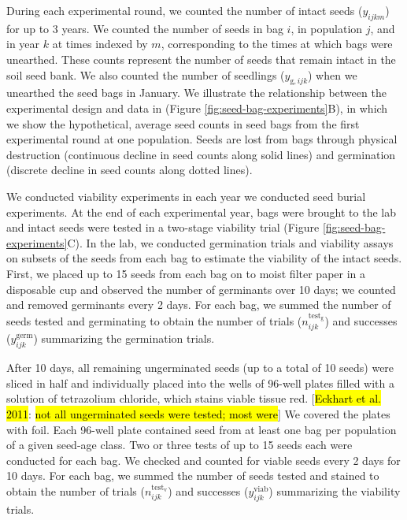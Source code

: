\documentclass[12pt, oneside, titlepage]{article}   	%
\begin{document}
During each experimental round, we counted the number of intact seeds ($y_{ijkm}$) for up to 3 years. We counted the number of seeds in bag $i$, in population $j$, and in year $k$ at times indexed by $m$, corresponding to the times at which bags were unearthed. These counts represent the number of seeds that remain intact in the soil seed bank. We also counted the number of seedlings ($y_{\mathrm{g},ijk}$) when we unearthed the seed bags in January. We illustrate the relationship between the experimental design and data in (Figure \ref{fig:seed-bag-experiments}B), in which we show the hypothetical, average seed counts in seed bags from the first experimental round at one population. Seeds are lost from bags through physical destruction (continuous decline in seed counts along solid lines) and germination (discrete decline in seed counts along dotted lines). 

We conducted viability experiments in each year we conducted seed burial experiments. At the end of each experimental year, bags were brought to the lab and intact seeds were tested in a two-stage viability trial (Figure \ref{fig:seed-bag-experiments}C). In the lab, we conducted germination trials and viability assays on subsets of the seeds from each bag to estimate the viability of the intact seeds. First, we placed up to 15 seeds from each bag on to moist filter paper in a disposable cup and observed the number of germinants over 10 days; we counted and removed germinants every 2 days. For each bag, we summed the number of seeds tested and germinating to obtain the number of trials ($n^\mathrm{test_g}_{ijk}$) and successes ($y^{\mathrm{germ}}_{ijk}$) summarizing the germination trials. 

After 10 days, all remaining ungerminated seeds (up to a total of 10 seeds) were sliced in half and individually placed into the wells of 96-well plates filled with a solution of tetrazolium chloride, which stains viable tissue red. [\hl{Eckhart et al. 2011}: \hl{not all ungerminated seeds were tested; most were}] We covered the plates with foil. Each 96-well plate contained seed from at least one bag per population of a given seed-age class. Two or three tests of up to 15 seeds each were conducted for each bag. We checked and counted for viable seeds  every 2 days for 10 days. For each bag, we summed the number of seeds tested and stained to obtain the number of trials ($n^\mathrm{test_v}_{ijk}$) and successes ($y^{\mathrm{viab}}_{ijk}$) summarizing the viability trials. 
\end{document}
